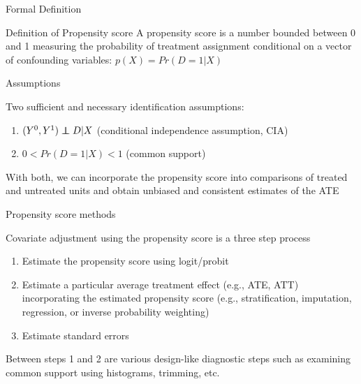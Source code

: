 \documentclass{beamer}
\newcommand\independent{\protect\mathpalette{\protect\independenT}{\perp}}
\def\independenT#1#2{\mathrel{\rlap{$#1#2$}\mkern2mu{#1#2}}}
\begin{document}
\begin{frame}{Formal Definition}
	
	\begin{block}{Definition of Propensity score}
	A propensity score is a number bounded between 0 and 1 measuring the probability of treatment assignment conditional on a vector of confounding variables: $p(X)=Pr(D=1 | X)$
	\end{block}

\end{frame}

\begin{frame}{Assumptions}

	Two sufficient and necessary identification assumptions:
	\begin{enumerate}
	\item $(Y^0,Y^1) \independent{D}|X$ (conditional independence assumption, CIA)
	\item $0<Pr(D=1|X)<1$ (common support)
	\end{enumerate}
	
	With both, we can incorporate the propensity score into comparisons of treated and untreated units and obtain unbiased and consistent estimates of the ATE

\end{frame}


\begin{frame}{Propensity score methods}
	
Covariate adjustment using the propensity score is a three step process	
		\begin{enumerate}
		\item Estimate the propensity score using logit/probit
		\item Estimate a particular average treatment effect (e.g., ATE, ATT) incorporating the estimated propensity score (e.g., stratification, imputation, regression, or inverse probability weighting)
		\item Estimate standard errors
		\end{enumerate}

Between steps 1 and 2 are various design-like diagnostic steps such as examining common support	using histograms, trimming, etc.

\end{frame}
\end{document}
